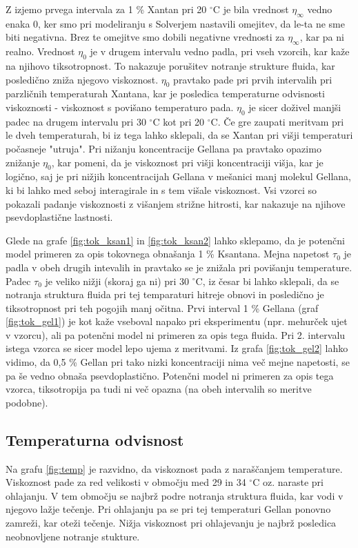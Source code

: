 \documentclass{article}
\begin{document}
Z izjemo prvega intervala za 1 \% Xantan pri 20 $^\circ$C je bila vrednost $\eta_{\infty}$ vedno enaka 0, ker smo pri modeliranju s Solverjem nastavili omejitev, da le-ta ne sme biti negativna. Brez te omejitve smo dobili negativne vrednosti za $\eta_{\infty}$, kar pa ni realno. Vrednost $\eta_0$ je v drugem intervalu vedno padla, pri vseh vzorcih, kar kaže na njihovo tiksotropnost. To nakazuje porušitev notranje strukture fluida, kar posledično zniža njegovo viskoznost. $\eta_0$ pravtako pade pri prvih intervalih pri parzličnih temperaturah Xantana, kar je posledica temperaturne odvisnosti viskoznosti - viskoznost s povišano temperaturo pada. $\eta_0$ je sicer doživel manjši padec na drugem intervalu pri 30 $^\circ$C kot pri 20 $^\circ$C. Če gre zaupati meritvam pri le dveh temperaturah, bi iz tega lahko sklepali, da se Xantan pri višji temperaturi počasneje "utruja". Pri nižanju koncentracije Gellana pa pravtako opazimo znižanje $\eta_0$, kar pomeni, da je viskoznost pri višji koncentraciji višja, kar je logično, saj je pri nižjih koncentracijah Gellana v mešanici manj molekul Gellana, ki bi lahko med seboj interagirale in s tem višale viskoznost. Vsi vzorci so pokazali padanje viskoznosti z višanjem  strižne hitrosti, kar nakazuje na njihove psevdoplastične lastnosti.

Glede na grafe \ref{fig:tok_ksan1} in \ref{fig:tok_ksan2} lahko sklepamo, da je potenčni model primeren za opis tokovnega obnašanja 1 \% Ksantana. Mejna napetost $\tau_0$ je padla v obeh drugih intevalih in pravtako se je znižala pri povišanju temperature. Padec $\tau_0$ je veliko nižji (skoraj ga ni) pri 30 $^\circ$C, iz česar bi lahko sklepali, da se notranja struktura fluida pri tej temparaturi hitreje obnovi in posledično je tiksotropnost pri teh pogojih manj očitna. Prvi interval 1 \% Gellana (graf \ref{fig:tok_gel1}) je kot kaže vseboval napako pri eksperimentu (npr. mehurček ujet v vzorcu), ali pa potenčni model ni primeren za opis tega fluida. Pri 2. intervalu istega vzorca se sicer model lepo ujema z meritvami. Iz grafa \ref{fig:tok_gel2} lahko vidimo, da 0,5 \% Gellan pri tako nizki koncentraciji nima več mejne napetosti, se pa še vedno obnaša psevdoplastično. Potenčni model ni primeren za opis tega vzorca, tiksotropija pa tudi ni več opazna (na obeh intervalih so meritve podobne).

\subsection{Temperaturna odvisnost}
Na grafu \ref{fig:temp} je razvidno, da viskoznost pada z naraščanjem temperature. Viskoznost pade za red velikosti v območju med 29 in 34 $^\circ$C oz. naraste pri ohlajanju. V tem območju se najbrž podre notranja struktura fluida, kar vodi v njegovo lažje tečenje. Pri ohlajanju pa se pri tej temperaturi Gellan ponovno zamreži, kar oteži tečenje. Nižja viskoznost pri ohlajevanju je najbrž posledica neobnovljene notranje stukture.

\newpage
\nocite{*}


\end{document}
